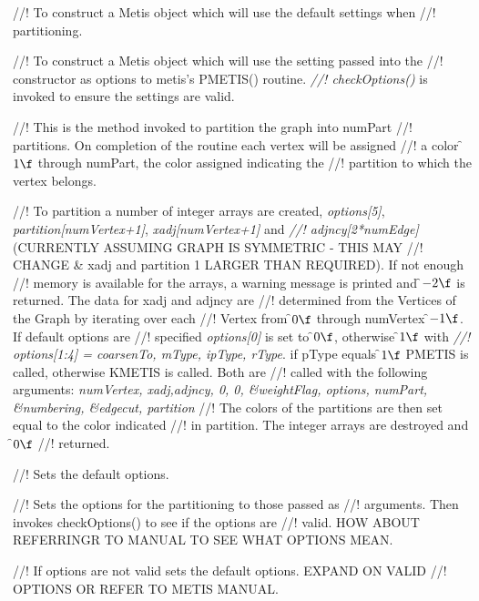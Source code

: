 //! To construct a Metis object which will use the default settings when
//! partitioning. 

//! To construct a Metis object which will use the setting passed into the
//! constructor as options to metis's PMETIS() routine. {\em
//! checkOptions()} is invoked to ensure the settings are valid.


//! This is the method invoked to partition the graph into \p numPart
//! partitions. On completion of the routine each vertex will be assigned
//! a color \f$1\f$ through \p numPart, the color assigned indicating the
//! partition to which the vertex belongs. 

//! To partition a number of integer arrays are created, {\em options[5]},
{\em partition[numVertex+1]}, {\em xadj[numVertex+1]} and {\em
//! adjncy[2*numEdge]} (CURRENTLY ASSUMING GRAPH IS SYMMETRIC - THIS MAY
//! CHANGE \& xadj and partition 1 LARGER THAN REQUIRED). If not enough
//! memory is available for the arrays, a warning message is printed and
\f$-2\f$ is returned. The data for \p xadj and \p adjncy are
//! determined from the Vertices of the Graph by iterating over each
//! Vertex from \f$0\f$ through \p numVertex \f$-1\f$. If default options are
//! specified {\em options[0]} is set to \f$0\f$, otherwise \f$1\f$ with {\em
//! options[1:4] = coarsenTo, mType, ipType, rType}. if \p pType equals
\f$1\f$ \p PMETIS is called, otherwise \p KMETIS is called. Both are
//! called with the following arguments: {\em numVertex, xadj,adjncy, 0,
0, \&weightFlag, options, numPart, \&numbering, \&edgecut, partition} 
//! The colors of the partitions are then set equal to the color indicated
//! in \p partition.  The integer arrays are destroyed and \f$0\f$
//! returned.

//! Sets the default options.

//! Sets the options for the partitioning to those passed as
//! arguments. Then invokes checkOptions() to see if the options are
//! valid. HOW ABOUT REFERRINGR TO MANUAL TO SEE WHAT OPTIONS MEAN.

//! If options are not valid sets the default options. EXPAND ON VALID
//! OPTIONS OR REFER TO METIS MANUAL.
